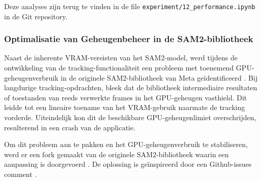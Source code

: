 Deze analyses zijn terug te vinden in de file \texttt{experiment/12\_performance.ipynb} in de Git repository.

\subsubsection{Optimalisatie van Geheugenbeheer in de SAM2-bibliotheek}

Naast de inherente VRAM-vereisten van het SAM2-model, werd tijdens de ontwikkeling van de tracking-functionaliteit een probleem met 
toenemend GPU-geheugenverbruik in de originele SAM2-bibliotheek van Meta geïdentificeerd \autocite{Hu2024facebookresearch}. 
Bij langdurige tracking-opdrachten, bleek dat de bibliotheek intermediaire 
resultaten of toestanden van reeds verwerkte frames in het GPU-geheugen vasthield. 
Dit leidde tot een lineaire toename van het VRAM-gebruik naarmate de tracking vorderde. 
Uiteindelijk kon dit de beschikbare GPU-geheugenlimiet overschrijden, resulterend in een crash van de applicatie. 

Om dit probleem aan te pakken en het GPU-geheugenverbruik te stabiliseren, werd er een fork gemaakt van de originele 
SAM2-bibliotheek waarin een aanpassing is doorgevoerd \autocite{Hu2025ilianbronchart}.
De oplossing is geïnspireerd door een Github-issues comment \autocite{heyoeyo2024comment}. 

